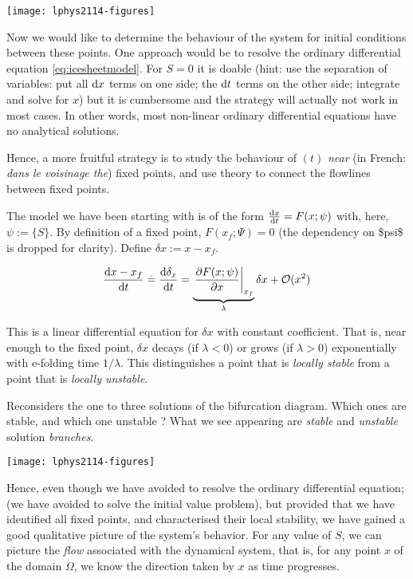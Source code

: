 \texttt{[image: lphys2114-figures]}

Now we would like to determine the behaviour of the system for initial
conditions between these points. One approach would be to resolve the
ordinary differential equation \eqref{eq:icesheetmodel}. For \(S=0\) it
is doable (hint: use the separation of variables: put all \(\mathop{}\!\mathrm{d} x\)
terms on one side; the \(\mathop{}\!\mathrm{d} t\) terms on the other side; integrate and
solve for \(x\)) but it is cumbersome and the strategy will actually not
work in most cases. In other words, most non-linear ordinary
differential equations have no analytical solutions.

Hence, a more fruitful strategy is to study the behaviour of \((t)\)
\emph{near} (in French: \emph{dans le voisinage the}) fixed points, and
use theory to connect the flowlines between fixed points.

The model we have been starting with is of the form
\(\ddt x = F (x;\psi)\) with, here, \(\psi := \{S\}\). By definition of
a fixed point, \(F(x_f;\Psi)=0\) (the dependency on \$psi\$ is dropped
for clarity). Define \(\delta x := x-x_f\).

\begin{equation}
\ddt {x-x_f} \eqbdef \ddt {\delta_x} = \underbrace {\left.\pd{F(x;\psi)}{x}\right|_{x_f}}_{\lambda}  \delta x + \mathcal{O}(x^2)
\end{equation}

This is a linear differential equation for \(\delta x\) with constant
coefficient. That is, near enough to the fixed point, \(\delta x\)
decays (if \(\lambda < 0\)) or grows (if \(\lambda > 0\)) exponentially
with e-folding time \(1/\lambda\). This distinguishes a point that is
\emph{locally stable} from a point that is \emph{locally unstable}.

\bcd
Reconsiders the one to three solutions of the bifurcation diagram. Which
ones are stable, and which one unstable ? What we see appearing are
\emph{stable} and \emph{unstable} solution \emph{branches}. \ecd 

\texttt{[image: lphys2114-figures]}

Hence, even though we have avoided to resolve the ordinary differential
equation; (we have avoided to solve the initial value problem), but
provided that we have identified all fixed points, and characterised
their local stability, we have gained a good qualitative picture of the
system's behavior. For any value of \(S\), we can picture the
\emph{flow} associated with the dynamical system, that is, for any point
\(x\) of the domain \(\Omega\), we know the direction taken by \(x\) as
time progresses.

